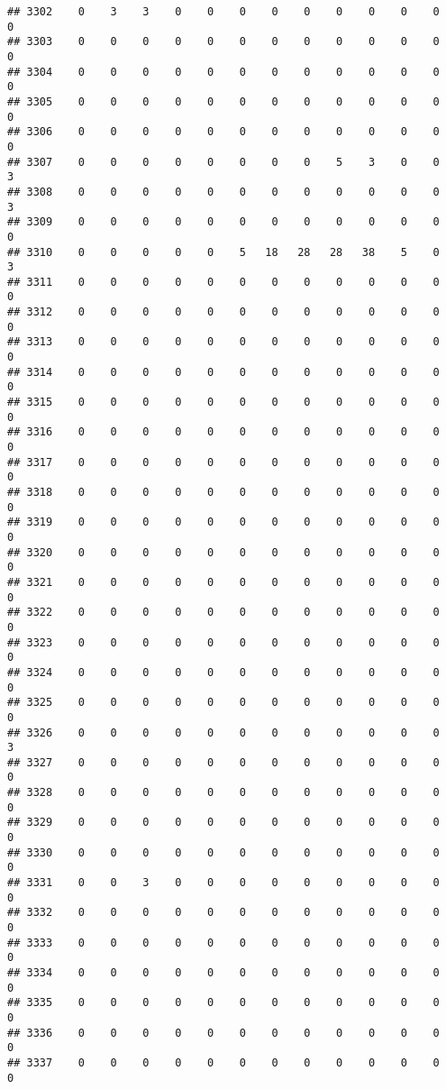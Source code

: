\documentclass[]{article}
\begin{document}
\begin{verbatim}
## 3302    0    3    3    0    0    0    0    0    0    0    0    0    0
## 3303    0    0    0    0    0    0    0    0    0    0    0    0    0
## 3304    0    0    0    0    0    0    0    0    0    0    0    0    0
## 3305    0    0    0    0    0    0    0    0    0    0    0    0    0
## 3306    0    0    0    0    0    0    0    0    0    0    0    0    0
## 3307    0    0    0    0    0    0    0    0    5    3    0    0    3
## 3308    0    0    0    0    0    0    0    0    0    0    0    0    3
## 3309    0    0    0    0    0    0    0    0    0    0    0    0    0
## 3310    0    0    0    0    0    5   18   28   28   38    5    0    3
## 3311    0    0    0    0    0    0    0    0    0    0    0    0    0
## 3312    0    0    0    0    0    0    0    0    0    0    0    0    0
## 3313    0    0    0    0    0    0    0    0    0    0    0    0    0
## 3314    0    0    0    0    0    0    0    0    0    0    0    0    0
## 3315    0    0    0    0    0    0    0    0    0    0    0    0    0
## 3316    0    0    0    0    0    0    0    0    0    0    0    0    0
## 3317    0    0    0    0    0    0    0    0    0    0    0    0    0
## 3318    0    0    0    0    0    0    0    0    0    0    0    0    0
## 3319    0    0    0    0    0    0    0    0    0    0    0    0    0
## 3320    0    0    0    0    0    0    0    0    0    0    0    0    0
## 3321    0    0    0    0    0    0    0    0    0    0    0    0    0
## 3322    0    0    0    0    0    0    0    0    0    0    0    0    0
## 3323    0    0    0    0    0    0    0    0    0    0    0    0    0
## 3324    0    0    0    0    0    0    0    0    0    0    0    0    0
## 3325    0    0    0    0    0    0    0    0    0    0    0    0    0
## 3326    0    0    0    0    0    0    0    0    0    0    0    0    3
## 3327    0    0    0    0    0    0    0    0    0    0    0    0    0
## 3328    0    0    0    0    0    0    0    0    0    0    0    0    0
## 3329    0    0    0    0    0    0    0    0    0    0    0    0    0
## 3330    0    0    0    0    0    0    0    0    0    0    0    0    0
## 3331    0    0    3    0    0    0    0    0    0    0    0    0    0
## 3332    0    0    0    0    0    0    0    0    0    0    0    0    0
## 3333    0    0    0    0    0    0    0    0    0    0    0    0    0
## 3334    0    0    0    0    0    0    0    0    0    0    0    0    0
## 3335    0    0    0    0    0    0    0    0    0    0    0    0    0
## 3336    0    0    0    0    0    0    0    0    0    0    0    0    0
## 3337    0    0    0    0    0    0    0    0    0    0    0    0    0

\end{verbatim}
\end{document}

